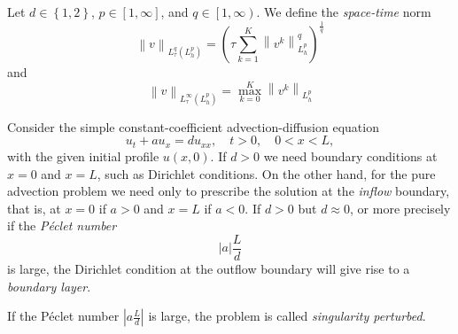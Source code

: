 \begin{frame}
    \begin{definition}
        Let $d\in\left\{1,2\right\}$, $p\in\left[1,\infty\right]$, and
        $q\in\left[1,\infty\right)$.
        We define the \emph{space-time} norm
        \begin{equation*}
            \left\|
            v
            \right\|_{L^{q}_{\tau}\left(L^{p}_{h}\right)}=
                {\left(\tau
                    \sum_{k=1}^{K}
                    \left\|v^{k}\right\|^{q}_{L^{p}_{h}}
                    \right)}^{\frac{1}{q}}
        \end{equation*}
        and
        \begin{equation*}
            \left\|
            v
            \right\|_{L^{\infty}_{\tau}\left(L^{p}_{h}\right)}=
            \max^{K}_{k=0}
            {\left\|
            v^{k}
            \right\|}_{L^{p}_{h}}
        \end{equation*}
    \end{definition}
\end{frame}

\begin{frame}
    \begin{definition}
        Consider the simple constant-coefficient advection-diffusion
        equation
        \begin{equation*}
            u_{t}+
            au_{x}=
            du_{xx},\quad
            t>0,\quad
            0<x<L,
        \end{equation*}
        with the given initial profile $u\left(x,0\right)$.
        If $d>0$ we need boundary conditions at $x=0$ and $x=L$,
        such as Dirichlet conditions.
        On the other hand, for the pure advection problem we need
        only to prescribe the solution at the \emph{inflow} boundary,
        that is, at $x=0$ if $a>0$ and $x=L$ if $a<0$.
        If $d>0$ but $d\approx0$, or more precisely if the
        \emph{Péclet number}
        \begin{equation*}
            \left|a\right|\frac{L}{d}
        \end{equation*}
        is large, the Dirichlet condition at the outflow boundary
        will give rise to a \emph{boundary layer}.

        If the Péclet number $\left|a\frac{L}{d}\right|$ is large,
        the problem is called \emph{singularity perturbed}.
    \end{definition}
\end{frame}

